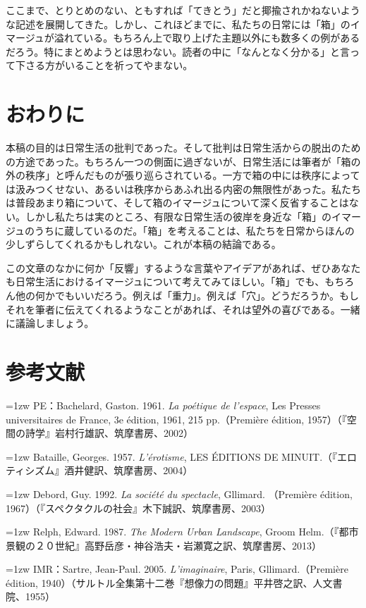 \documentclass[b5j,twoside,twocolumn]{utarticle}
\begin{document}
ここまで、とりとめのない、ともすれば「てきとう」だと揶揄されかねないような記述を展開してきた。しかし、これほどまでに、私たちの日常には「箱」のイマージュが溢れている。もちろん上で取り上げた主題以外にも数多くの例があるだろう。特にまとめようとは思わない。読者の中に「なんとなく分かる」と言って下さる方がいることを祈ってやまない。


\section{おわりに}
本稿の目的は日常生活の批判であった。そして批判は日常生活からの脱出のための方途であった。もちろん一つの側面に過ぎないが、日常生活には筆者が「箱の外の秩序」と呼んだものが張り巡らされている。一方で箱の中には秩序によっては汲みつくせない、あるいは秩序からあふれ出る内密の無限性があった。私たちは普段あまり箱について、そして箱のイマージュについて深く反省することはない。しかし私たちは実のところ、有限な日常生活の彼岸を身近な「箱」のイマージュのうちに蔵しているのだ。「箱」を考えることは、私たちを日常からほんの少しずらしてくれるかもしれない。これが本稿の結論である。


この文章のなかに何か「反響」するような言葉やアイデアがあれば、ぜひあなたも日常生活におけるイマージュについて考えてみてほしい。「箱」でも、もちろん他の何かでもいいだろう。例えば「重力」。例えば「穴」。どうだろうか。もしそれを筆者に伝えてくれるようなことがあれば、それは望外の喜びである。一緒に議論しましょう。

\section*{参考文献}
\hangindent=1zw
\noindent PE：Bachelard, Gaston. 1961.\textsl{ La poétique de l'espace}, Les Presses universitaires de France, 3e édition, 1961, 215 pp.（Première édition, 1957）（『空間の詩学』岩村行雄訳、筑摩書房、2002）

\hangindent=1zw
\noindent Bataille, Georges. 1957. \textsl{L'érotisme}, LES ÉDITIONS DE MINUIT.（『エロティシズム』酒井健訳、筑摩書房、2004）

\hangindent=1zw
\noindent Debord, Guy. 1992. \textsl{La société du spectacle}, Gllimard. （Première édition, 1967）（『スペクタクルの社会』木下誠訳、筑摩書房、2003）

\hangindent=1zw
\noindent Relph, Edward. 1987. \textsl{The Modern Urban Landscape}, Groom Helm.（『都市景観の２０世紀』高野岳彦・神谷浩夫・岩瀬寛之訳、筑摩書房、2013）

\hangindent=1zw
\noindent IMR：Sartre, Jean-Paul. 2005. \textsl{L'imaginaire}, Paris, Gllimard.（Première édition, 1940）（サルトル全集第十二巻『想像力の問題』平井啓之訳、人文書院、1955）
\end{document}
